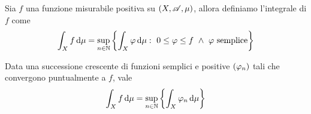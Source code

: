 \begin{definition}\label{DefIntPos}
	Sia $f$ una funzione misurabile positiva su $(X,\mathscr A,\mu)$, allora definiamo l'integrale di $f$ come
	\begin{equation*}
		\int_Xf\,\mathrm d\mu=\sup_{n\in\mathbb N}\left\{\int_X\varphi\,\mathrm d \mu:\ 0\le \varphi\le f\ \wedge\ \varphi \text{ semplice}\right\}
	\end{equation*}
\end{definition}

\begin{proposition}
	Data una successione crescente di funzioni semplici e positive $(\varphi_n)$ tali che convergono puntualmente a $f$, vale 
	\begin{equation*}
		\int_X f\,\mathrm d\mu=\sup_{n\in\mathbb N}\left\{\int_X\varphi_n\,\mathrm d\mu\right\}
	\end{equation*}
\end{proposition}
